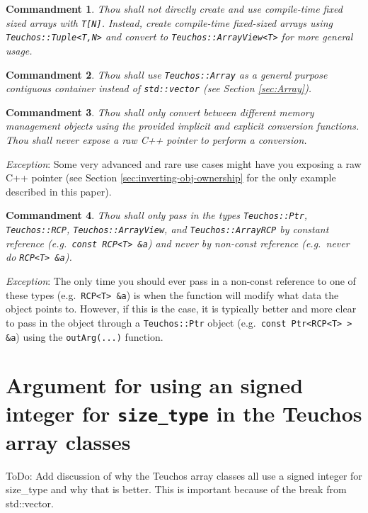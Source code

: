 \documentclass[pdf,ps2pdf,11pt]{SANDreport}
\newtheorem{commandment}{Commandment}
\begin{document}
\begin{commandment}
Thou shall not directly create and use compile-time fixed sized arrays
with {}\texttt{T[N]}.  Instead, create compile-time fixed-sized arrays
using {}\texttt{Teuchos::Tuple<T,N>} and convert to
{}\texttt{Teuchos::ArrayView<T>} for more general usage.
\end{commandment}

\begin{commandment}
Thou shall use {}\texttt{Teuchos::Array} as a general purpose
contiguous container instead of {}\texttt{std::vector} (see Section
{}\ref{sec:Array}).
\end{commandment}

\begin{commandment}
Thou shall only convert between different memory management objects
using the provided implicit and explicit conversion functions.  Thou
shall never expose a raw C++ pointer to perform a conversion.
\end{commandment}
{}\textit{Exception}: Some very advanced and rare use cases might have
you exposing a raw C++ pointer (see Section
{}\ref{sec:inverting-obj-ownership} for the only example described in
this paper).

\begin{commandment}
Thou shall only pass in the types {}\texttt{Teuchos::Ptr},
{}\texttt{Teuchos::RCP}, {}\texttt{Teuchos::ArrayView}, and
{}\texttt{Teuchos::ArrayRCP} by constant reference (e.g.\
{}\texttt{const RCP<T> \&a}) and never by non-const reference (e.g.\
never do {}\texttt{RCP<T> \&a}).
\end{commandment}
{}\textit{Exception}: The only time you should ever pass in a
non-const reference to one of these types (e.g.\ {}\texttt{RCP<T>
\&a}) is when the function will modify what data the object points to.
However, if this is the case, it is typically better and more clear to
pass in the object through a {}\texttt{Teuchos::Ptr} object (e.g.\
{}\texttt{const Ptr<RCP<T> > \&a}) using the {}\texttt{outArg(...)} 
function.


%
{}\section{Argument for using an signed integer for
{}\texttt{size\_type} in the Teuchos array classes}
\label{sec:unsigned_size_type}
%

ToDo: Add discussion of why the Teuchos array classes all use a signed
integer for size\_type and why that is better.  This is important
because of the break from std::vector.
\end{document}
